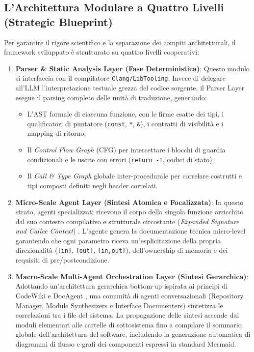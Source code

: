 \subsection{L'Architettura Modulare a Quattro Livelli (Strategic Blueprint)}
\label{subsec:architettura_blueprint}
Per garantire il rigore scientifico e la separazione dei compiti architetturali, il framework sviluppato è strutturato su quattro livelli cooperativi:
\begin{enumerate}
    \item \textbf{Parser \& Static Analysis Layer (Fase Deterministica)}: Questo modulo si interfaccia con il compilatore \texttt{Clang/LibTooling}. Invece di delegare all'LLM l'interpretazione testuale grezza del codice sorgente, il Parser Layer esegue il parsing completo delle unità di traduzione, generando:
    \begin{itemize}[leftmargin=*, label=\textbullet]
        \item L'AST formale di ciascuna funzione, con le firme esatte dei tipi, i qualificatori di puntatore (\texttt{const}, \texttt{*}, \texttt{\&}), i contratti di visibilità e i mapping di ritorno;
        \item Il \emph{Control Flow Graph} (CFG) per intercettare i blocchi di guardia condizionali e le uscite con errori (\texttt{return -1}, codici di stato);
        \item Il \emph{Call \& Type Graph} globale inter-procedurale per correlare costrutti e tipi composti definiti negli header correlati.
    \end{itemize}
    \item \textbf{Micro-Scale Agent Layer (Sintesi Atomica e Focalizzata)}: In questo strato, agenti specializzati ricevono il corpo della singola funzione arricchito dal suo contesto compilativo e strutturale circostante (\emph{Expanded Signature and Callee Context}) \cite{lomshakov_proconsul_2024}. L'agente genera la documentazione tecnica micro-level garantendo che ogni parametro riceva un'esplicitazione della propria direzionalità (\texttt{[in]}, \texttt{[out]}, \texttt{[in,out]}), dell'ownership di memoria e dei requisiti di pre/postcondizione.
    \item \textbf{Macro-Scale Multi-Agent Orchestration Layer (Sintesi Gerarchica)}: Adottando un'architettura gerarchica bottom-up ispirata ai principi di CodeWiki \cite{hoang_codewiki_2026} e DocAgent \cite{yang_docagent_2025}, una comunità di agenti conversazionali (Repository Manager, Module Synthesizers e Interface Documenters) sintetizza le correlazioni tra i file del sistema. La propagazione delle sintesi ascende dai moduli elementari alle cartelle di sottosistema fino a compilare il sommario globale dell'architettura del software, includendo la generazione automatica di diagrammi di flusso e grafi dei componenti espressi in standard Mermaid.

\end{enumerate}
